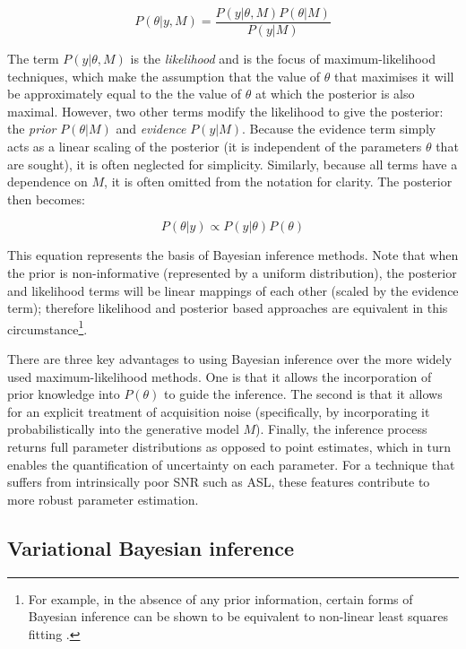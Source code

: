 \begin{equation} 
P(\theta | y, M) = \frac{ P(y | \theta, M) P(\theta | M) }{ P(y | M) }
\end{equation}

The term $P(y|\theta, M)$ is the \textit{likelihood} and is the focus of maximum-likelihood techniques, which make the assumption that the value of $\theta$ that maximises it will be approximately equal to the the value of $\theta$ at which the posterior is also maximal. However, two other terms modify the likelihood to give the posterior: the \textit{prior} $P(\theta | M)$ and \textit{evidence} $P(y | M)$. Because the evidence term simply acts as a linear scaling of the posterior (it is independent of the parameters $\theta$ that are sought), it is often neglected for simplicity. Similarly, because all terms have a dependence on $M$, it is often omitted from the notation for clarity. The posterior then becomes: 

\begin{equation} 
P(\theta | y) \propto P(y | \theta) P(\theta)
\label{eqn_bayes_posterior}
\end{equation}

This equation represents the basis of Bayesian inference methods. Note that when the prior is non-informative (represented by a uniform distribution), the posterior and likelihood terms will be linear mappings of each other (scaled by the evidence term); therefore likelihood and posterior based approaches are equivalent in this circumstance\footnote{For example, in the absence of any prior information, certain forms of Bayesian inference can be shown to be equivalent to non-linear least squares fitting \cite{Chappell2009}.}. 

There are three key advantages to using Bayesian inference over the more widely used maximum-likelihood methods. One is that it allows the incorporation of prior knowledge into $P(\theta)$ to guide the inference. The second is that it allows for an explicit treatment of acquisition noise (specifically, by incorporating it probabilistically into the generative model $M$). Finally, the inference process returns full parameter distributions as opposed to point estimates, which in turn enables the quantification of uncertainty on each parameter. For a technique that suffers from intrinsically poor SNR such as ASL, these features contribute to more robust parameter estimation. 

\subsection{Variational Bayesian inference}
\label{vb_section}

